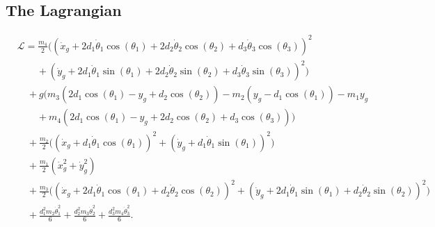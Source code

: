 \documentclass{article}
\begin{document}
\subsection{The Lagrangian}
\[
\begin{aligned}
	& \mathcal{L} = \frac{m_4}{2}\bigl((\dot{x}_g + 2d_1\dot{\theta}_1\cos(\theta_1) + 2d_2\dot{\theta}_2\cos(\theta_2) 
	+ d_3\dot{\theta}_3\cos(\theta_3))^2 \\
	&\qquad + (\dot{y}_g + 2d_1\dot{\theta}_1\sin(\theta_1) + 2d_2\dot{\theta}_2\sin(\theta_2) 
	+ d_3\dot{\theta}_3\sin(\theta_3))^2 \bigr) \\
	&\quad + g\bigl(m_3(2d_1\cos(\theta_1) - y_g + d_2\cos(\theta_2)) 
	- m_2(y_g - d_1\cos(\theta_1)) - m_1y_g \\
	&\qquad + m_4(2d_1\cos(\theta_1) - y_g + 2d_2\cos(\theta_2) + d_3\cos(\theta_3))\bigr) \\
	&\quad + \frac{m_2}{2}\bigl((\dot{x}_g + d_1\dot{\theta}_1\cos(\theta_1))^2 
	+ (\dot{y}_g + d_1\dot{\theta}_1\sin(\theta_1))^2\bigr) \\
	&\quad + \frac{m_1}{2}(\dot{x}_g^2 + \dot{y}_g^2) \\
	&\quad + \frac{m_3}{2}\bigl((\dot{x}_g + 2d_1\dot{\theta}_1\cos(\theta_1) + d_2\dot{\theta}_2\cos(\theta_2))^2 
	+ (\dot{y}_g + 2d_1\dot{\theta}_1\sin(\theta_1) + d_2\dot{\theta}_2\sin(\theta_2))^2\bigr) \\
	&\quad + \frac{d_1^2 m_2 \dot{\theta}_1^2}{6} 
	+ \frac{d_2^2 m_3 \dot{\theta}_2^2}{6} 
	+ \frac{d_3^2 m_4 \dot{\theta}_3^2}{6}.
\end{aligned}
\]
\end{document}
